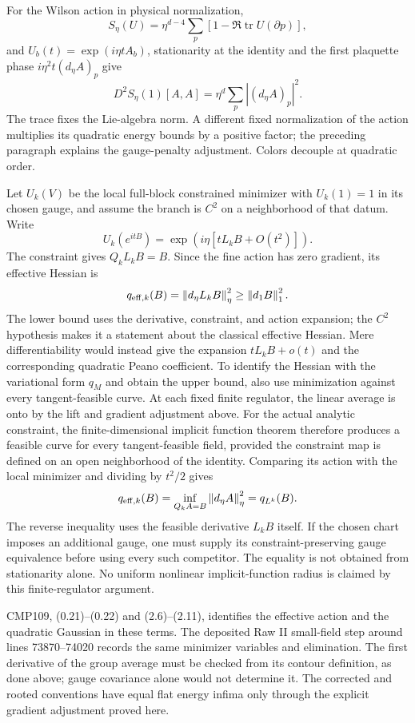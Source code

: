 \documentclass[11pt]{article}
\theoremstyle{remark}
\newcommand{\norm}[1]{\left\|#1\right\|}
\begin{document}
For the Wilson action in physical normalization,
\[
 S_\eta(U)=\eta^{d-4}\sum_p[1-\Re\operatorname{tr}U(\partial p)],
\]
and $U_b(t)=\exp(i\eta tA_b)$, stationarity at the identity and
the first plaquette phase $i\eta^2t(d_\eta A)_p$ give
\[
 D^2S_\eta(1)[A,A]=\eta^d\sum_p|(d_\eta A)_p|^2.
\]
The trace fixes the Lie-algebra norm. A different fixed normalization
of the action multiplies its quadratic energy bounds by a positive
factor; the preceding paragraph explains the gauge-penalty adjustment.
Colors decouple at quadratic order.

Let $U_k(V)$ be the local full-block constrained minimizer with
$U_k(1)=1$ in its chosen gauge, and assume the branch is $C^2$
on a neighborhood of that datum. Write
\[
 U_k(e^{itB})=\exp(i\eta[tL_kB+O(t^2)]).
\]
The constraint gives $Q_kL_kB=B$. Since the fine action has zero
gradient, its effective Hessian is
\[
 q_{{\rm eff},k}(B)=\norm{d_\eta L_kB}_\eta^2
                  \ge\norm{d_1B}_1^2.
\]
The lower bound uses the derivative, constraint, and action expansion;
the $C^2$ hypothesis makes it a statement about the classical effective
Hessian. Mere differentiability would instead give the expansion
$tL_kB+o(t)$ and the corresponding quadratic Peano coefficient.
To identify the Hessian with the variational form
$q_M$ and obtain the upper bound, also use minimization against
every tangent-feasible curve. At each fixed finite regulator, the
linear average is onto by the lift and gradient adjustment above.
For the actual analytic constraint, the finite-dimensional implicit
function theorem therefore produces a feasible curve for every
tangent-feasible field, provided the constraint map is defined on
an open neighborhood of the identity. Comparing its action with
the local minimizer and dividing by $t^2/2$ gives
\[
 q_{{\rm eff},k}(B)=
       \inf_{Q_kA=B}\norm{d_\eta A}_\eta^2=q_{L^k}(B).
\]
The reverse inequality uses the feasible derivative $L_kB$ itself.
If the chosen chart imposes an additional gauge, one must supply
its constraint-preserving gauge equivalence before using every
such competitor. The equality is not obtained from stationarity
alone. No uniform nonlinear implicit-function radius is claimed
by this finite-regulator argument.

CMP109, (0.21)--(0.22) and (2.6)--(2.11), identifies the effective
action and the quadratic Gaussian in these terms. The deposited
Raw II small-field step around lines 73870--74020 records the same
minimizer variables and elimination. The first derivative of the
group average must be checked from its contour definition, as done
above; gauge covariance alone would not determine it. The corrected
and rooted conventions have equal flat energy infima only through
the explicit gradient adjustment proved here.
\end{document}
